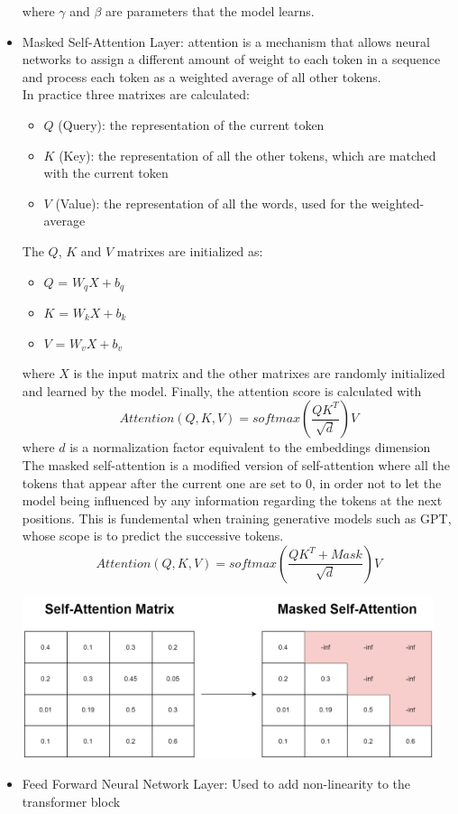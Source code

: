 \begin{itemize}
    where $\gamma$ and $\beta$ are parameters that the model learns.
    \item Masked Self-Attention Layer: attention is a mechanism that allows neural networks to assign a different amount of weight to each token in a sequence and process each token as a weighted average of all other tokens. \\
    In practice three matrixes are calculated:
    \begin{itemize}
        \item $Q$ (Query): the representation of the current token
        \item $K$ (Key): the representation of all the other tokens, which are matched with the current token
        \item $V$ (Value): the representation of all the words, used for the weighted-average
    \end{itemize}
    The $Q$, $K$ and $V$ matrixes are initialized as:
    \begin{itemize}
        \item $Q$ = $W_qX + b_q$ 
        \item $K$ = $W_kX + b_k$ 
        \item $V$ = $W_vX + b_v$
    \end{itemize}
    where $X$ is the input matrix and the other matrixes are randomly initialized and learned by the model.
    Finally, the attention score is calculated with
    \begin{equation*}
        Attention(Q,K,V) = softmax \left(\frac{QK^T}{\sqrt{d}}\right)V
    \end{equation*}
    where $d$ is a normalization factor equivalent to the embeddings dimension \\
    The masked self-attention is a modified version of self-attention where all the tokens that appear after the current one are set to $0$, in order not to let the model being influenced by any information regarding the tokens at the next positions. This is fundemental when training generative models such as GPT, whose scope is to predict the successive tokens.
    \begin{equation*}
        Attention(Q,K,V) = softmax\left(\frac{QK^T + Mask}{\sqrt{d}}\right)V
    \end{equation*}

    \includegraphics[width=0.95\textwidth]{images/masked_self_attention.drawio.png}

    \item Feed Forward Neural Network Layer: Used to add non-linearity to the transformer block
\end{itemize}

